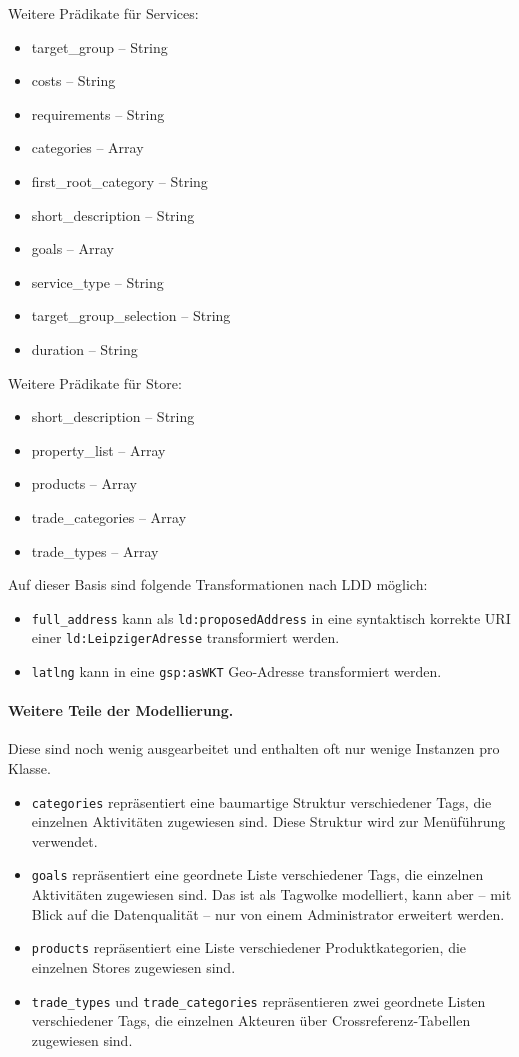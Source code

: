 \documentclass[a4paper,11pt]{article}
\begin{document}
Weitere Prädikate für Services:
\begin{itemize}\itemsep0pt
  \item target\_group -- String
  \item costs -- String
  \item requirements -- String
  \item categories -- Array
  \item first\_root\_category -- String
  \item short\_description -- String
  \item goals -- Array
  \item service\_type -- String
  \item target\_group\_selection -- String
  \item duration -- String
\end{itemize}

Weitere Prädikate für Store:
\begin{itemize}\itemsep0pt
  \item short\_description -- String
  \item property\_list -- Array
  \item products -- Array
  \item trade\_categories -- Array
  \item trade\_types -- Array
\end{itemize}

Auf dieser Basis sind folgende Transformationen nach LDD möglich:
\begin{itemize}\raggedright
\item \texttt{full\_address} kann als \texttt{ld:proposedAddress} in eine
  syntaktisch korrekte URI einer \texttt{ld:LeipzigerAdresse} transformiert
  werden. 
\item \texttt{latlng} kann in eine \texttt{gsp:asWKT} Geo-Adresse
  transformiert werden.
\end{itemize}

\paragraph{Weitere Teile der Modellierung.}
Diese sind noch wenig ausgearbeitet und enthalten oft nur wenige Instanzen pro
Klasse. 
\begin{itemize}\itemsep0pt
\item \texttt{categories} repräsentiert eine baumartige Struktur verschiedener
  Tags, die einzelnen Aktivitäten zugewiesen sind.  Diese Struktur wird zur
  Menüführung verwendet. 
\item \texttt{goals} repräsentiert eine geordnete Liste verschiedener Tags, die
  einzelnen Aktivitäten zugewiesen sind. Das ist als Tagwolke modelliert, kann
  aber -- mit Blick auf die Datenqualität -- nur von einem Administrator
  erweitert werden.
\item \texttt{products} repräsentiert eine Liste verschiedener
  Produktkategorien, die einzelnen Stores zugewiesen sind.
\item \texttt{trade\_types} und \texttt{trade\_categories} repräsentieren zwei
  geordnete Listen verschiedener Tags, die einzelnen Akteuren über 
  Crossreferenz-Tabellen zugewiesen sind.
\end{itemize}
\newpage
\end{document}

